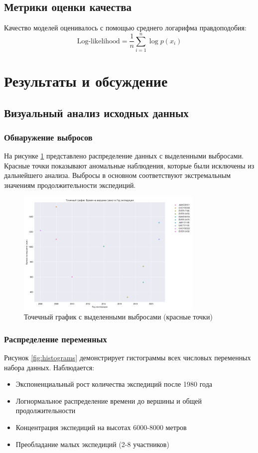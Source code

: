 \documentclass[12pt, a4paper]{article}
\begin{document}
\subsection{Метрики оценки качества}
Качество моделей оценивалось с помощью среднего логарифма правдоподобия:
\[ \text{Log-likelihood} = \frac{1}{n} \sum_{i=1}^{n} \log p(x_i) \]

\section{Результаты и обсуждение}
\subsection{Визуальный анализ исходных данных}
\subsubsection{Обнаружение выбросов}
На рисунке \ref{fig:outliers} представлено распределение данных с выделенными выбросами. Красные точки показывают аномальные наблюдения, которые были исключены из дальнейшего анализа. Выбросы в основном соответствуют экстремальным значениям продолжительности экспедиций.

\begin{figure}[H]
    \centering
    \includegraphics[width=0.8\textwidth]{Figure_1.png}
    \caption{Точечный график с выделенными выбросами (красные точки)}
    \label{fig:outliers}
\end{figure}

\subsubsection{Распределение переменных}
Рисунок \ref{fig:histograms} демонстрирует гистограммы всех числовых переменных набора данных. Наблюдается:
\begin{itemize}
    \item Экспоненциальный рост количества экспедиций после 1980 года
    \item Логнормальное распределение времени до вершины и общей продолжительности
    \item Концентрация экспедиций на высотах 6000-8000 метров
    \item Преобладание малых экспедиций (2-8 участников)
\end{itemize}
\end{document}
